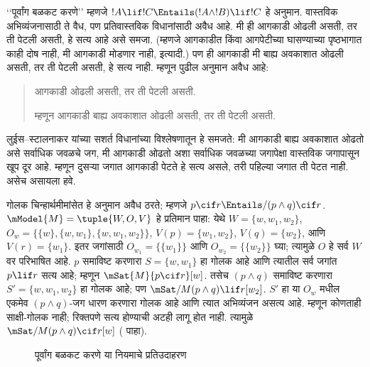 \documentclass[../../../include/open-logic-section]{subfiles}
\begin{document}


‘‘पूर्वांग बळकट करणे’’ म्हणजे
$!A \lif !C \Entails
(!A \land !B) \lif !C$
हे अनुमान. वास्तविक
अभिव्यंजनासाठी ते वैध,
पण प्रतिवास्तविक
विधानांसाठी अवैध आहे.
मी ही आगकाडी ओढली असती,
तर ती पेटली असती,
हे सत्य आहे असे समजा.
(म्हणजे आगकाडीत किंवा
आगपेटीच्या घासण्याच्या
पृष्ठभागात काही दोष नाही,
मी आगकाडी मोडणार नाही,
इत्यादी.) पण ही
आगकाडी मी बाह्य
अवकाशात ओढली असती,
तर ती पेटली असती,
हे सत्य नाही. म्हणून
पुढील अनुमान अवैध आहे:
\begin{quote}
  आगकाडी ओढली असती,
  तर ती पेटली असती.

  म्हणून आगकाडी बाह्य
  अवकाशात ओढली असती,
  तर ती पेटली असती.
\end{quote}

लुईस--स्टालनाकर यांच्या
सशर्त विधानांच्या
विश्लेषणातून हे
समजते: मी आगकाडी
बाह्य अवकाशात
ओढतो असे सर्वाधिक
जवळचे जग, मी
आगकाडी ओढतो
अशा सर्वाधिक
जवळच्या जगापेक्षा
वास्तविक जगापासून
खूप दूर आहे.
म्हणून दुसऱ्या
जगात आगकाडी
पेटते हे सत्य
असले, तरी
पहिल्या जगात
ती पेटत नाही.
असेच असायला हवे.

\begin{ex}
  गोलक चिन्हार्थमीमांसेत हे अनुमान
  अवैध ठरते; म्हणजे
  $p \cif r \Entails/
  (p \land q) \cif r$.
  $\mModel{M} = \tuple{W, O, V}$
  हे प्रतिमान पाहा: येथे
  $W = \{w, w_1, w_2\}$,
  $O_w = \{\{w\}, \{w,
  w_1\}, \{w, w_1, w_2\}\}$,
  $V(p) = \{w_1, w_2\}$,
  $V(q) = \{w_2\}$, आणि
  $V(r) = \{w_1\}$.
  इतर जगांसाठी $O_{w_1}=\{\{w_1\}\}$ आणि
  $O_{w_2}=\{\{w_2\}\}$ घ्या; त्यामुळे $O$ हे
  सर्व $W$ वर परिभाषित आहे.
  $p$ समाविष्ट करणारा
  $S = \{w, w_1\}$
  हा गोलक आहे आणि
  त्यातील सर्व जगांत
  $p \lif r$ सत्य आहे;
  म्हणून
  $\mSat{M}{p \cif r}[w]$.
  तसेच $(p \land q)$
  समाविष्ट करणारा
  $S' = \{w, w_1, w_2\}$
  हा गोलक आहे; पण
  $\mSat/{M}{(p \land q) \lif r}[w_2]$.
  $S'$ हा या $O_w$ मधील एकमेव $(p\land q)$-जग
  धारण करणारा गोलक आहे आणि त्यात अभिव्यंजन असत्य आहे.
  म्हणून कोणताही साक्षी-गोलक नाही; रिक्तपणे सत्य होण्याची
  अटही लागू होत नाही. त्यामुळे
  $\mSat/{M}{(p \land q) \cif r}[w]$
  ( पाहा).

\begin{figure}
\begin{center}
\caption{पूर्वांग बळकट करणे या नियमाचे प्रतिउदाहरण}
\end{center}
\end{figure}
\end{ex}
\end{document}
